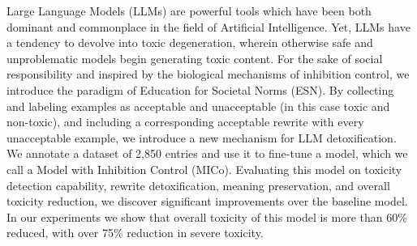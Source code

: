 Large Language Models (LLMs) are powerful tools which have been both dominant and commonplace in the field of Artificial Intelligence. Yet, LLMs have a tendency to devolve into toxic degeneration, wherein otherwise safe and unproblematic models begin generating toxic content. For the sake of social responsibility and inspired by the biological mechanisms of inhibition control, we introduce the paradigm of Education for Societal Norms (ESN). By collecting and labeling examples as acceptable and unacceptable (in this case toxic and non-toxic), and including a corresponding acceptable rewrite with every unacceptable example, we introduce a new mechanism for LLM detoxification.  We annotate a dataset of 2,850 entries and use it to fine-tune a model, which we call a Model with Inhibition Control (MICo). Evaluating this model on toxicity detection capability, rewrite detoxification, meaning preservation, and overall toxicity reduction, we discover significant improvements over the baseline model. In our experiments we show that overall toxicity of this model is more than 60\% reduced, with over 75\% reduction in severe toxicity.